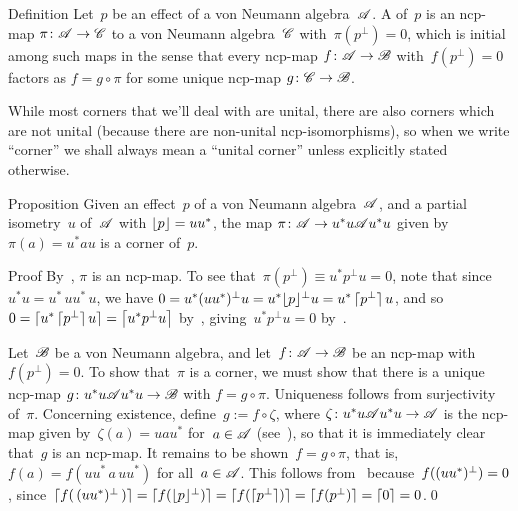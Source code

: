 \documentclass[a]{subfiles}
\begin{document}
\begin{parsec}%
\begin{point}[corner]{Definition}%
Let~$p$ be an effect of a von Neumann algebra~$\mathscr{A}$.
A %
of~$p$ is an
ncp-map $\pi\colon \mathscr{A}\to\mathscr{C}$
to a von Neumann algebra~$\mathscr{C}$
with~$\pi(p^\perp)=0$,
which is initial among such maps 
in the sense
that every ncp-map $f\colon \mathscr{A}\to\mathscr{B}$
with~$f(p^\perp)=0$
factors as $f=g\circ\pi$
for some unique ncp-map $g\colon \mathscr{C}\to\mathscr{B}$.

While most corners
that we'll deal with are unital,
there are also corners which are not unital
(because there are non-unital
ncp-isomorphisms),
so when we write ``corner'' we shall
always mean a ``unital corner''%
unless explicitly stated otherwise.
\end{point}
\begin{point}{Proposition}%
Given an effect~$p$ of a von Neumann algebra~$\mathscr{A}$,
and a partial isometry~$u$ of~$\mathscr{A}$
with $\left\lfloor p\right\rfloor=uu^*$,
the map $\pi\colon \mathscr{A}\to u^*u \mathscr{A} u^*u$
given by~$\pi(a)=u^*au$ is a corner of~$p$.
\begin{point}{Proof}%
By~, $\pi$ is an ncp-map.
To see that~$\pi(p^\perp)\equiv u^*p^\perp u =0$,
note that since~$u^*u=u^*\,u u^*\,u$,
we have $0=u^*(uu^*)^\perp u =u^*\smash{\left\lfloor p\right\rfloor}^\perp u
= u^*\left\lceil\smash{p^\perp}\right\rceil u$,
and so
$0 = \left\lceil u^* \left\lceil\smash{p^\perp}\right\rceil u \right\rceil
=\left\lceil u^* p^\perp u\right\rceil$
by~,
giving~$u^*p^\perp u=0$
by~.


Let~$\mathscr{B}$ be a von Neumann algebra,
and let~$f\colon \mathscr{A}\to\mathscr{B}$ be an ncp-map
with $f(p^\perp)=0$.
To show that~$\pi$ is a corner,
we must show that there is a unique ncp-map
$g\colon u^*u \mathscr{A} u^*u\to\mathscr{B}$
with $f=g\circ \pi$.
Uniqueness follows
from surjectivity of~$\pi$.
Concerning existence,
define~$g:= f\circ \zeta$,
where $\zeta\colon  u^*u\mathscr{A} u^*u\to \mathscr{A}$
is the ncp-map given by~$\zeta(a)=uau^*$
for~$a\in\mathscr{A}$ (see~),
so that it is immediately clear that~$g$ is an ncp-map.
It remains to be shown~$f=g\circ \pi$,
that is,
$f(a)=f(uu^*\,a\,uu^*)$ for all~$a\in\mathscr{A}$.
This follows from~
because~$f(\smash{(uu^*)^\perp})=0$,
since~$\left\lceil\smash{f(\,\smash{(uu^*)^\perp}\,)}\right\rceil
=\left\lceil\smash{f(\smash{\left\lfloor p\right\rfloor}^\perp)}\right\rceil
=\left\lceil\smash{f(\left\lceil\smash{p^\perp}\right\rceil)}\right\rceil
= \left\lceil\smash{f(p^\perp)}\right\rceil=\left\lceil0\right\rceil=0$.\qed
\end{point}
\end{point}
\end{parsec}
\end{document}
